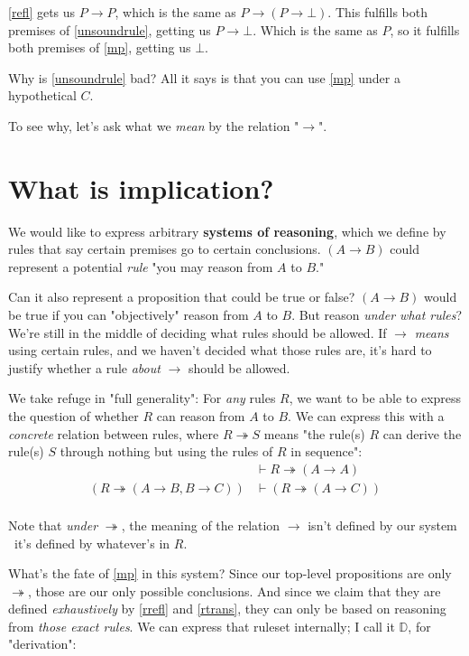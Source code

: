 \documentclass{article}
\begin{document}
  \eqref{refl} gets us $P \to P$, which is the same as $P \to (P \to \bot)$.
  This fulfills both premises of \eqref{unsoundrule}, getting us $P \to \bot$.
  Which is the same as $P$, so it fulfills both premises of \eqref{mp}, getting us $\bot$.

  Why is \eqref{unsoundrule} bad? All it says is that you can use \eqref{mp} under a hypothetical $C$.
  
  To see why, let's ask what we \emph{mean} by the relation "$\to$".

  \section{What is implication?}

  We would like to express arbitrary \textbf{systems of reasoning}, which we define by rules that say certain premises go to certain conclusions.
  $(A \to B)$ could represent a potential \emph{rule} \textendash "you may reason from $A$ to $B$."

  Can it also represent a proposition that could be true or false? $(A \to B)$ would be true if you can "objectively" reason from $A$ to $B$.
  But reason \emph{under what rules}?
  We're still in the middle of deciding what rules should be allowed.
  If $\to$ \emph{means} using certain rules, and we haven't decided what those rules are, it's hard to justify whether a rule \emph{about} $\to$ should be allowed.

  We take refuge in "full generality": For \emph{any} rules $R$, we want to be able to express the question of whether $R$ can reason from $A$ to $B$.
  We can express this with a \emph{concrete} relation between rules, where $R \twoheadrightarrow S$ means "the rule(s) $R$ can derive the rule(s) $S$ through nothing but using the rules of $R$ in sequence":
  \begin{align*}
    \label{rrefl}
    \tag{reflexivity}
    &\vdash R \twoheadrightarrow (A \to A) \\
    \label{rtrans}
    \tag{transitivity}
    (R \twoheadrightarrow (A \to B, B \to C)) &\vdash (R \twoheadrightarrow (A \to C)) \\
  \end{align*}

  Note that \emph{under} $\twoheadrightarrow$, the meaning of the relation $\to$ isn't defined by our system \textendash\ it's defined by whatever's in $R$.

  What's the fate of \eqref{mp} in this system?
  Since our top-level propositions are only $\twoheadrightarrow$, those are our only possible conclusions.
  And since we claim that they are defined \emph{exhaustively} by \eqref{rrefl} and \eqref{rtrans}, they can only be based on reasoning from \emph{those exact rules}.
  We can express that ruleset internally; I call it $\mathbb{D}$, for "derivation":
\end{document}
